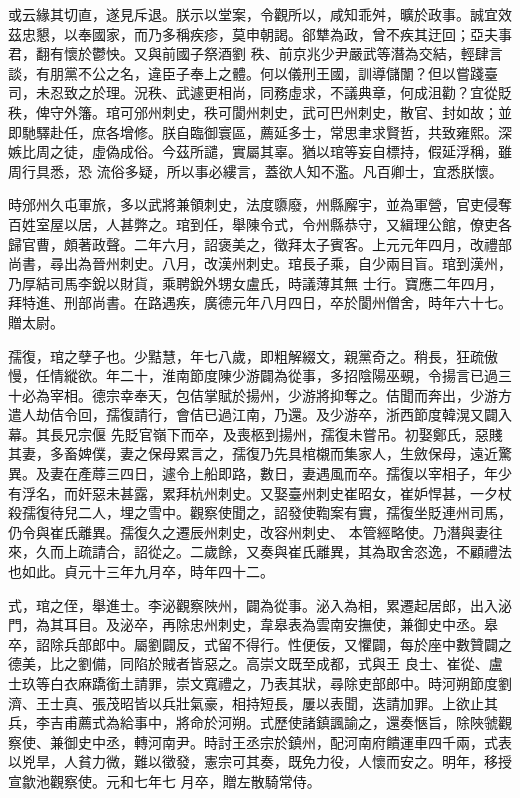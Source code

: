 \begin{pinyinscope}
 或云緣其切直，遂見斥退。朕示以堂案，令觀所以，咸知乖舛，曠於政事。誠宜效茲忠懇，以奉國家，而乃多稱疾疹，莫申朝謁。郤犨為政，曾不疾其迂回；亞夫事君，翻有懷於鬱怏。又與前國子祭酒劉
 秩、前京兆少尹嚴武等潛為交結，輕肆言談，有朋黨不公之名，違臣子奉上之體。何以儀刑王國，訓導儲闈？但以嘗踐臺司，未忍致之於理。況秩、武遽更相尚，同務虛求，不議典章，何成沮勸？宜從貶秩，俾守外籓。琯可邠州刺史，秩可閬州刺史，武可巴州刺史，散官、封如故；並即馳驛赴任，庶各增修。朕自臨御寰區，薦延多士，常思聿求賢哲，共致雍熙。深嫉比周之徒，虛偽成俗。今茲所譴，實屬其辜。猶以琯等妄自標持，假延浮稱，雖周行具悉，恐
 流俗多疑，所以事必縷言，蓋欲人知不濫。凡百卿士，宜悉朕懷。



 時邠州久屯軍旅，多以武將兼領刺史，法度隳廢，州縣廨宇，並為軍營，官吏侵奪百姓室屋以居，人甚弊之。琯到任，舉陳令式，令州縣恭守，又緝理公館，僚吏各歸官曹，頗著政聲。二年六月，詔褒美之，徵拜太子賓客。上元元年四月，改禮部尚書，尋出為晉州刺史。八月，改漢州刺史。琯長子乘，自少兩目盲。琯到漢州，乃厚結司馬李銳以財貨，乘聘銳外甥女盧氏，時議薄其無
 士行。寶應二年四月，拜特進、刑部尚書。在路遇疾，廣德元年八月四日，卒於閬州僧舍，時年六十七。贈太尉。



 孺復，琯之孽子也。少黠慧，年七八歲，即粗解綴文，親黨奇之。稍長，狂疏傲慢，任情縱欲。年二十，淮南節度陳少游闢為從事，多招陰陽巫覡，令揚言已過三十必為宰相。德宗幸奉天，包佶掌賦於揚州，少游將抑奪之。佶聞而奔出，少游方遣人劫佶令回，孺復請行，會佶已過江南，乃還。及少游卒，浙西節度韓滉又闢入幕。其長兄宗偃
 先貶官嶺下而卒，及喪柩到揚州，孺復未嘗吊。初娶鄭氏，惡賤其妻，多畜婢僕，妻之保母累言之，孺復乃先具棺櫬而集家人，生斂保母，遠近驚異。及妻在產蓐三四日，遽令上船即路，數日，妻遇風而卒。孺復以宰相子，年少有浮名，而奸惡未甚露，累拜杭州刺史。又娶臺州刺史崔昭女，崔妒悍甚，一夕杖殺孺復待兒二人，埋之雪中。觀察使聞之，詔發使鞫案有實，孺復坐貶連州司馬，仍令與崔氏離異。孺復久之遷辰州刺史，改容州刺史、
 本管經略使。乃潛與妻往來，久而上疏請合，詔從之。二歲餘，又奏與崔氏離異，其為取舍恣逸，不顧禮法也如此。貞元十三年九月卒，時年四十二。



 式，琯之侄，舉進士。李泌觀察陜州，闢為從事。泌入為相，累遷起居郎，出入泌門，為其耳目。及泌卒，再除忠州刺史，韋皋表為雲南安撫使，兼御史中丞。皋卒，詔除兵部郎中。屬劉闢反，式留不得行。性便佞，又懼闢，每於座中數贊闢之德美，比之劉備，同陷於賊者皆惡之。高崇文既至成都，式與王
 良士、崔從、盧士玖等白衣麻蹻銜土請罪，崇文寬禮之，乃表其狀，尋除吏部郎中。時河朔節度劉濟、王士真、張茂昭皆以兵壯氣豪，相持短長，屢以表聞，迭請加罪。上欲止其兵，李吉甫薦式為給事中，將命於河朔。式歷使諸鎮諷諭之，還奏愜旨，除陜虢觀察使、兼御史中丞，轉河南尹。時討王丞宗於鎮州，配河南府饋運車四千兩，式表以兇旱，人貧力微，難以徵發，憲宗可其奏，既免力役，人懷而安之。明年，移授宣歙池觀察使。元和七年七
 月卒，贈左散騎常侍。




\end{pinyinscope}
